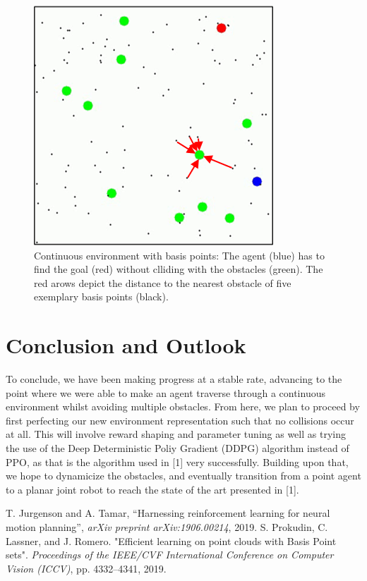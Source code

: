 \documentclass[conference]{IEEEtran}
\begin{document}
\begin{figure}[htbp]
\centerline{\includegraphics{bps.png}}
\caption{Continuous environment with basis points: The agent (blue) has to find the goal (red) without clliding with the obstacles (green). The red arows depict the distance to the nearest obstacle of five exemplary basis points (black).}
\label{fig1}
\end{figure}

\section{Conclusion and Outlook} 

To conclude, we have been making progress at a stable rate, advancing to the point where we were able to make an agent traverse through a continuous environment whilst avoiding multiple obstacles. From here, we plan to proceed by first perfecting our new environment representation such that no collisions occur at all. This will involve reward shaping and parameter tuning as well as trying the use of the Deep Deterministic Poliy Gradient (DDPG) algorithm instead of PPO, as that is the algorithm used in [1] very successfully. Building upon that, we hope to dynamicize the obstacles, and eventually transition from a point agent to a planar joint robot to reach the state of the art presented in [1].

\begin{thebibliography}{00}
 T. Jurgenson and A. Tamar, ``Harnessing reinforcement learning for neural
motion planning'',  \textit{arXiv preprint arXiv:1906.00214}, 2019.
 S. Prokudin, C. Lassner, and J. Romero. "Efficient learning on point clouds with Basis Point sets". \textit{Proceedings of the IEEE/CVF International Conference on Computer Vision (ICCV)}, pp. 4332–4341, 2019.

\end{thebibliography}
\end{document}
